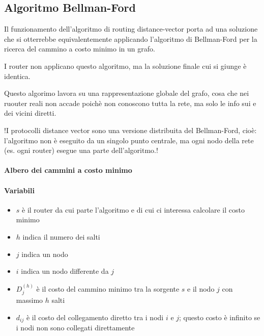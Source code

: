 \subsection{Algoritmo Bellman-Ford}
Il funzionamento dell'algoritmo di routing distance-vector porta ad una
soluzione che si otterrebbe equivalentemente applicando l'algoritmo di
Bellman-Ford per la ricerca del cammino a costo minimo in un grafo.

I router non applicano questo algoritmo, ma la
soluzione finale cui si giunge è identica.

Questo algorimo lavora su una rappresentazione globale del grafo, cosa che nei ruouter reali non accade poichè non conoscono tutta la rete, ma solo le info sui e dei vicini diretti.

!I protocolli distance vector sono una versione distribuita del Bellman-Ford, cioè: l'algoritmo non è eseguito da un singolo punto centrale, ma ogni nodo della rete (es. ogni router) esegue una parte dell'algoritmo.!

\paragraph{Albero dei cammini a costo minimo}


\paragraph{Variabili}
\begin{multicols}{2}
\begin{itemize}
    \item $s$ è il router da cui parte l'algoritmo e di cui ci interessa calcolare il costo minimo
    \item $h$ indica il numero dei salti
    \item $j$ indica un nodo
    \item $i$ indica un nodo differente da $j$
    \item $D_j^{(h)}$ è il costo del cammino minimo tra la sorgente $s$ e il nodo $j$ con massimo $h$ salti
    \item $d_{ij}$ è il costo del collegamento diretto tra i nodi $i$ e $j$; questo costo è infinito se i nodi non sono collegati direttamente
\end{itemize}
\end{multicols}



